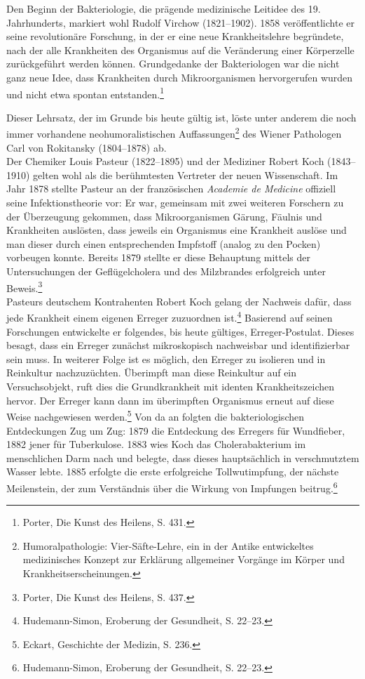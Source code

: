 \documentclass[
    a4paper,
    12pt,
    hyphens,
    chapterprefix=true,
    headheight=33pt,
    footheight=29pt,
    headings=optiontohead,
]{scrartcl}
\begin{document}
Den Beginn der Bakteriologie, die prägende medizinische Leitidee des 19. Jahrhunderts, markiert wohl Rudolf Virchow (1821--1902). 1858 veröffentlichte er seine revolutionäre Forschung, in der er eine neue Krankheitslehre begründete, nach der alle Krankheiten des Organismus auf die Veränderung einer Körperzelle zurückgeführt werden können. Grundgedanke der Bakteriologen war die nicht ganz neue Idee, dass Krankheiten durch Mikroorganismen hervorgerufen wurden und nicht etwa spontan entstanden.\footnote{Porter, Die Kunst des Heilens, S. 431.}

\newpage

Dieser Lehrsatz, der im Grunde bis heute gültig ist, löste unter anderem die noch immer vorhandene neohumoralistischen Auffassungen\footnote{Humoralpathologie: Vier-Säfte-Lehre, ein in der Antike entwickeltes medizinisches Konzept zur Erklärung allgemeiner Vorgänge im
Körper und Krankheitserscheinungen.} des Wiener Pathologen Carl von Rokitansky (1804--1878) ab.\\
Der Chemiker Louis Pasteur (1822--1895) und der Mediziner Robert Koch (1843--1910) gelten wohl als die berühmtesten Vertreter der neuen Wissenschaft. Im Jahr 1878 stellte Pasteur an der französischen \textit{Academie de Medicine} offiziell seine Infektionstheorie vor: Er war, gemeinsam mit zwei weiteren Forschern zu der Überzeugung gekommen, dass Mikroorganismen Gärung, Fäulnis und Krankheiten auslösten, dass jeweils ein Organismus eine Krankheit auslöse und man dieser durch einen entsprechenden Impfstoff (analog zu den Pocken) vorbeugen konnte. Bereits 1879 stellte er diese Behauptung mittels der Untersuchungen der Geflügelcholera und des Milzbrandes erfolgreich unter Beweis.\footnote{Porter, Die Kunst des Heilens, S. 437.}\\
Pasteurs deutschem Kontrahenten Robert Koch gelang der Nachweis dafür, dass jede Krankheit einem eigenen Erreger zuzuordnen ist.\footnote{Hudemann-Simon, Eroberung der Gesundheit, S. 22--23.} Basierend auf seinen Forschungen entwickelte er folgendes, bis heute gültiges, Erreger-Postulat. Dieses besagt, dass ein Erreger zunächst mikroskopisch nachweisbar und identifizierbar sein muss. In weiterer Folge ist es möglich, den Erreger zu isolieren und in Reinkultur nachzuzüchten. Überimpft man diese Reinkultur auf ein Versuchsobjekt, ruft dies die Grundkrankheit mit identen Krankheitszeichen hervor. Der Erreger kann dann im überimpften Organismus erneut auf diese Weise nachgewiesen werden.\footnote{Eckart, Geschichte der Medizin, S. 236.}
Von da an folgten die bakteriologischen Entdeckungen Zug um Zug: 1879 die Entdeckung des Erregers für Wundfieber, 1882 jener für Tuberkulose. 1883 wies Koch das Cholerabakterium im menschlichen Darm nach und belegte, dass dieses hauptsächlich in verschmutztem Wasser lebte. 1885 erfolgte die erste erfolgreiche Tollwutimpfung, der nächste Meilenstein, der zum Verständnis über die Wirkung von Impfungen beitrug.\footnote{Hudemann-Simon, Eroberung der Gesundheit, S. 22--23.}
\end{document}
